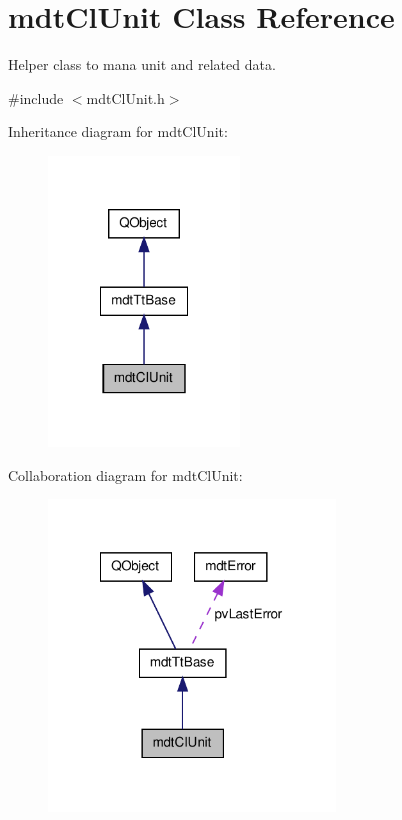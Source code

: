 \hypertarget{classmdt_cl_unit}{\section{mdt\-Cl\-Unit Class Reference}
\label{classmdt_cl_unit}
}


Helper class to mana unit and related data.  




{\ttfamily \#include $<$mdt\-Cl\-Unit.\-h$>$}



Inheritance diagram for mdt\-Cl\-Unit\-:
\nopagebreak
\begin{figure}[H]
\begin{center}
\leavevmode
\includegraphics[width=144pt]{classmdt_cl_unit__inherit__graph}
\end{center}
\end{figure}


Collaboration diagram for mdt\-Cl\-Unit\-:
\nopagebreak
\begin{figure}[H]
\begin{center}
\leavevmode
\includegraphics[width=216pt]{classmdt_cl_unit__coll__graph}
\end{center}
\end{figure}
